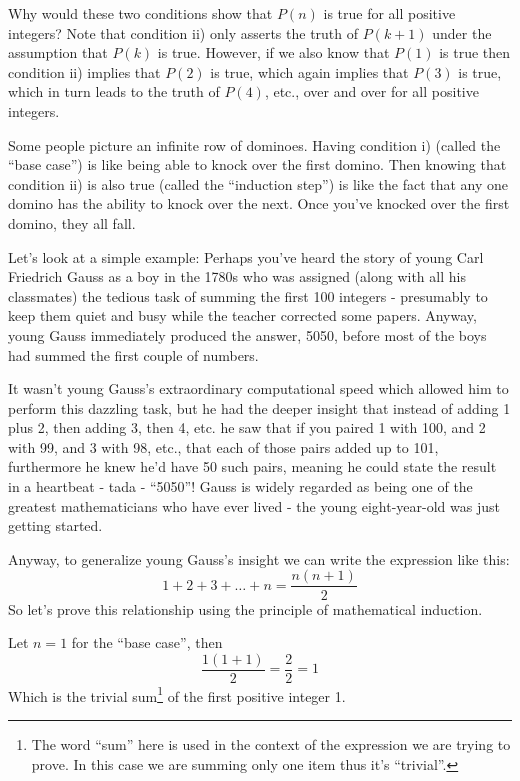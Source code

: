 \documentclass{article}
\begin{document}
Why would these two conditions show that $P(n)$ is true for all
positive integers? Note that condition ii) only asserts the truth
of $P(k+1)$ under the assumption that $P(k)$ is true.
However, if we also know that $P(1)$ is true then condition ii) implies that $P(2)$ is true,
which again implies that $P(3)$ is true,
which in turn leads to the truth of $P(4)$,
etc., over and over for all positive integers.

Some people picture an infinite row of dominoes.
Having condition i) (called the ``base case'') is like being
able to knock over the first domino.
Then knowing that condition ii) is also true (called the ``induction step'') is like the
fact that any one domino has the ability to knock over the next.
Once you've knocked over the first domino,
they all fall.

Let's look at a simple example:
Perhaps you've heard the story of young Carl Friedrich Gauss
as a boy in
the 1780s who was assigned (along with all his classmates)
the tedious task of summing the first 100 integers -
presumably to keep them quiet and busy while the
teacher corrected some papers. Anyway,
young Gauss immediately produced the answer,
5050, before most of the boys had summed the first couple of numbers.

It wasn't young Gauss's extraordinary computational speed which allowed
him to perform this dazzling task,
but he had the deeper insight that instead of adding 1 plus 2,
then adding 3, then 4, etc.
he saw that if you paired 1 with 100,
and 2 with 99,
and 3 with 98,
etc.,
that each of those pairs added up to 101,
furthermore he knew he'd have 50 such pairs,
meaning he could state the result in a heartbeat - tada - ``5050''!
Gauss is widely regarded as being one of the greatest
mathematicians who have ever lived - the young eight-year-old was just getting started.

Anyway,
to generalize young Gauss's insight we can write the expression like this:
\[1+2+3+\ldots+n=\frac{n(n+1)}{2}\]
So let's prove this relationship using the principle of mathematical induction.
\bigskip

Let $n=1$ for the ``base case'',
then
\[\frac{1(1+1)}{2}=\frac{2}{2}=1\]
Which is the trivial sum\footnote{The word ``sum'' here is used
in the context of the expression
we are trying to prove. In this case we are summing
only one item thus it's ``trivial''.} of the first positive integer 1.
\bigskip
\end{document}
